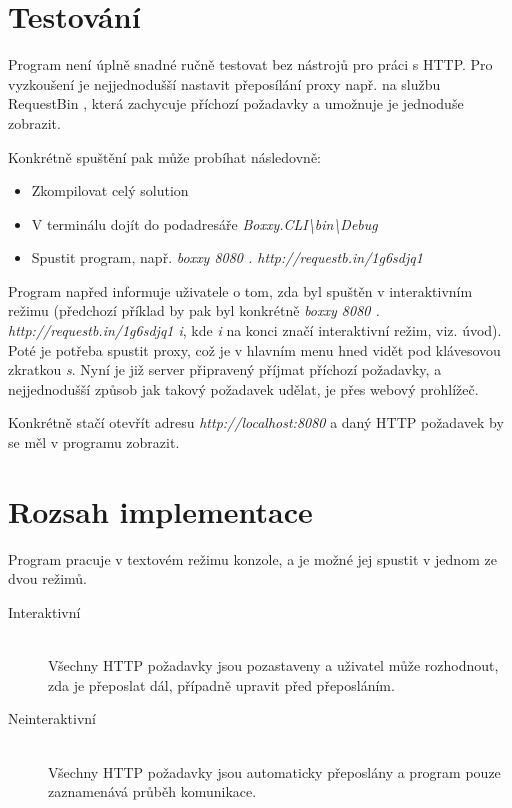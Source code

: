 \documentclass{article}
\begin{document}
\section{Testování}

Program není úplně snadné ručně testovat bez nástrojů pro práci s HTTP. Pro vyzkoušení je nejjednodušší nastavit přeposílání proxy např. na službu RequestBin \cite{requestbin}, která zachycuje příchozí požadavky a umožnuje je jednoduše zobrazit.

Konkrétně spuštění pak může probíhat následovně:

\begin{itemize}
	\item Zkompilovat celý solution
	\item V terminálu dojít do podadresáře \emph{Boxxy.CLI\textbackslash bin\textbackslash Debug}
	\item Spustit program, např. \emph{boxxy 8080 . http://requestb.in/1g6sdjq1}
\end{itemize}

Program napřed informuje uživatele o tom, zda byl spuštěn v interaktivním režimu (předchozí příklad by pak byl konkrétně \emph{boxxy 8080 . http://requestb.in/1g6sdjq1 i}, kde \emph{i} na konci značí interaktivní režim, viz. úvod). Poté je potřeba spustit proxy, což je v hlavním menu hned vidět pod klávesovou zkratkou \emph{s}. Nyní je již server připravený příjmat příchozí požadavky, a nejjednodušší způsob jak takový požadavek udělat, je přes webový prohlížeč.

Konkrétně stačí otevřít adresu \emph{http://localhost:8080} a daný HTTP požadavek by se měl v programu zobrazit.

\section{Rozsah implementace}

Program pracuje v textovém režimu konzole, a je možné jej spustit v jednom ze dvou režimů.

\begin{description}
	\item[Interaktivní] \hfill \\
		Všechny HTTP požadavky jsou pozastaveny a uživatel může rozhodnout, zda je přeposlat dál, případně upravit před přeposláním.
	\item[Neinteraktivní] \hfill \\
		Všechny HTTP požadavky jsou automaticky přeposlány a program pouze zaznamenává průběh komunikace.
\end{description}
\end{document}

